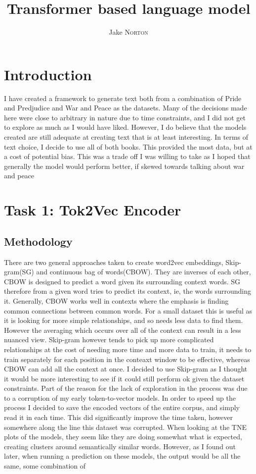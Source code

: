 \documentclass[12pt]{article} \usepackage{COSC420style} \usepackage{soul}
\title{Transformer based language model}
\author{Jake \textsc{Norton}} \studentid{5695756}
\begin{document}
\maketitle

\section{Introduction}

I have created a framework to generate text both from a combination of Pride and Predjudice and War
and Peace as the datasets. Many of the decisions made here were close to arbitrary in nature due to
time constraints, and I did not get to explore as much as I would have liked. However, I do believe
that the models created are still adequate at creating text that is at least interesting. In terms
of text choice, I decide to use all of both books. This provided the most data, but at a cost of
potential bias. This was a trade off I was willing to take as I hoped that generally the model would
perform better, if skewed towards talking about war and peace

\section{Task 1: Tok2Vec Encoder}

\subsection{Methodology}

There are two general approaches taken to create word2vec embeddings, Skip-gram(SG) and continuous bag
of words(CBOW). They are inverses of each other, CBOW is designed to predict a word given its
surrounding context words. SG therefore from a given word tries to predict its context, ie, the
words surrounding it. Generally, CBOW works well in contexts where the emphasis is finding common
connections between common words. For a small dataset this is useful as it is looking for more
simple relationships, and so needs less data to find them. However the averaging which occurs over
all of the context can result in a less nuanced view. Skip-gram however tends to pick up more
complicated relationships at the cost of needing more time and more data to train, it needs to train
separately for each position in the conteaxt window to be effective, whereas CBOW can add all the
context at once. I decided to use Skip-gram as I thought it would be more interesting to see if it
could still perform ok given the dataset constraints. Part of the reason for the lack of exploration
in the process was due to a corruption of my early token-to-vector models. In order to speed up the
process I decided to save the encoded vectors of the entire corpus, and simply read it in each time.
This did significantly improve the time taken, however somewhere along the line this dataset was
corrupted. When looking at the TNE plots of the models, they seem like they are doing somewhat what
is expected, creating clusters around semantically similar words. However, as I found out later,
when running a prediction on these models, the output would be all the same, some combination of
\end{document}
